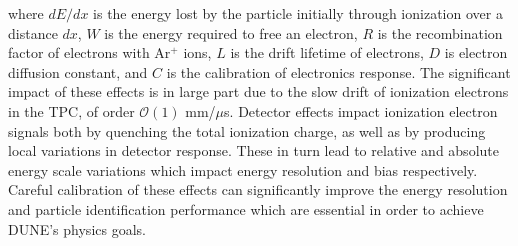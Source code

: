 where $dE/dx$ is the energy lost by the particle initially through ionization over a distance $dx$, $W$ is the energy required to free an electron, $R$ is the recombination factor of electrons with Ar${^+}$ ions, $L$ is the drift lifetime of electrons, $D$ is electron diffusion constant, and $C$ is the calibration of electronics response. The significant impact of these effects is in large part due to the slow drift of ionization electrons in the TPC, of order $\mathcal{O}(1)$ mm/$\mu$s. Detector effects impact ionization electron signals both by quenching the total ionization charge, as well as by producing local variations in detector response. These in turn lead to relative and absolute energy scale variations which impact energy resolution and bias respectively. Careful calibration of these effects can significantly improve the energy resolution and particle identification performance which are essential in order to achieve DUNE's physics goals.

